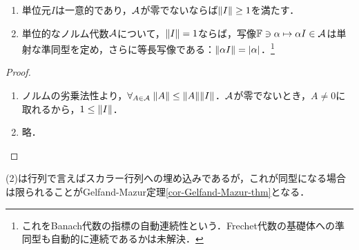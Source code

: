 \documentclass[uplatex,dvipdfmx]{jsreport}
\begin{document}
\begin{lemma}[単位元の性質について]\mbox{}
    \begin{enumerate}
        \item 単位元$I$は一意的であり，$\mathcal{A}$が零でないならば$\|I\|\ge 1$を満たす．
        \item 単位的なノルム代数$\mathcal{A}$について，$\|I\|=1$ならば，写像$\mathbb{F}\ni\alpha\mapsto\alpha I\in\mathcal{A}$は単射な準同型を定め，さらに等長写像である：$\|\alpha I\|=\lvert\alpha\rvert$．\footnote{これをBanach代数の指標の自動連続性という．Frechet代数の基礎体への準同型も自動的に連続であるかは未解決．}
    \end{enumerate}
\end{lemma}
\begin{proof}\mbox{}
    \begin{enumerate}
        \item ノルムの劣乗法性より，$\forall_{A\in\mathcal{A}}\;\|A\|\le\|A\|\|I\|$．$\mathcal{A}$が零でないとき，$A\ne 0$に取れるから，$1\le\|I\|$．
        \item 略．
    \end{enumerate}
\end{proof}
\begin{remarks}
    (2)は行列で言えばスカラー行列への埋め込みであるが，これが同型になる場合は限られることがGelfand-Mazur定理\ref{cor-Gelfand-Mazur-thm}となる．
\end{remarks}
\end{document}
